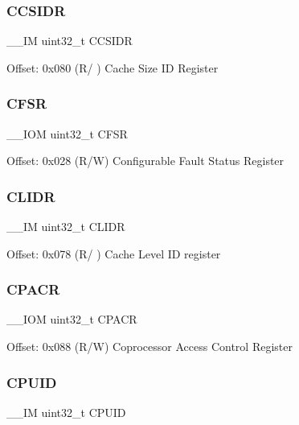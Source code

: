 \subsubsection{\texorpdfstring{CCSIDR}{CCSIDR}}
{\footnotesize\ttfamily \+\_\+\+\_\+\+IM uint32\+\_\+t C\+C\+S\+I\+DR}

Offset\+: 0x080 (R/ ) Cache Size ID Register \mbox{\label{struct_s_c_b___type_a0f9e27357254e6e953a94f95bda040b1}} 
\subsubsection{\texorpdfstring{CFSR}{CFSR}}
{\footnotesize\ttfamily \+\_\+\+\_\+\+I\+OM uint32\+\_\+t C\+F\+SR}

Offset\+: 0x028 (R/W) Configurable Fault Status Register \mbox{\label{struct_s_c_b___type_a40b4dc749a25d1c95c2125e88683a591}} 
\subsubsection{\texorpdfstring{CLIDR}{CLIDR}}
{\footnotesize\ttfamily \+\_\+\+\_\+\+IM uint32\+\_\+t C\+L\+I\+DR}

Offset\+: 0x078 (R/ ) Cache Level ID register \mbox{\label{struct_s_c_b___type_ab8e9dd6ca5f31244ea352ed0c19155d8}} 
\subsubsection{\texorpdfstring{CPACR}{CPACR}}
{\footnotesize\ttfamily \+\_\+\+\_\+\+I\+OM uint32\+\_\+t C\+P\+A\+CR}

Offset\+: 0x088 (R/W) Coprocessor Access Control Register \mbox{\label{struct_s_c_b___type_adbf8292503748ba6421a523bdee6819d}} 
\subsubsection{\texorpdfstring{CPUID}{CPUID}}
{\footnotesize\ttfamily \+\_\+\+\_\+\+IM uint32\+\_\+t C\+P\+U\+ID}

